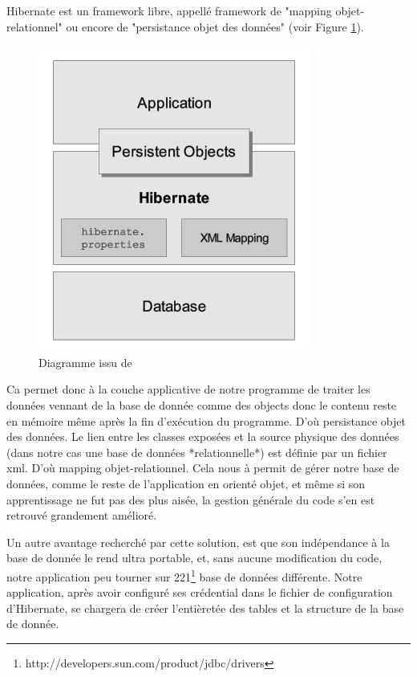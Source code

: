 Hibernate est un framework libre, appellé framework de  "mapping objet-relationnel" ou encore de "persistance objet des données" (voir Figure \ref{reference2}). 
\begin{figure}[!h]
    \center
   	\includegraphics[scale=0.65]{schema_hibernate.png}
   	\caption{Diagramme issu de\url{}}
    \label{reference2}
\end{figure}
Ca permet donc à la couche applicative de notre programme de traiter les données vennant de la base de donnée comme des objects donc le contenu reste en mémoire même après la fin d'exécution du programme. D'où persistance objet des données. Le lien entre les classes exposées et la source physique des données (dans notre cas une base de données *relationnelle*) est définie par un fichier xml. D'où mapping objet-relationnel.
Cela nous à permit de gérer notre base de données, comme le reste de l'application en orienté objet, et même si son apprentissage ne fut pas des plus aisée, la gestion générale du code s'en est retrouvé grandement amélioré.

Un autre avantage recherché par cette solution, est que son indépendance à la base de donnée le rend ultra portable, et, sans aucune modification du code, notre application peu tourner sur 221\footnote{http://developers.sun.com/product/jdbc/drivers} base de données différente.  Notre application, après avoir configuré ses crédential dans le fichier de configuration d'Hibernate, se chargera de créer l'entièretée des tables et la structure de la base de donnée.

